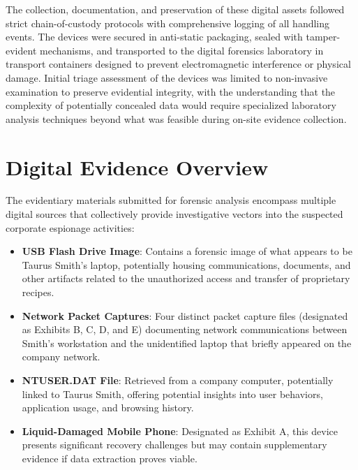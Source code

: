 The collection, documentation, and preservation of these digital assets followed strict chain-of-custody protocols with comprehensive logging of all handling events. The devices were secured in anti-static packaging, sealed with tamper-evident mechanisms, and transported to the digital forensics laboratory in transport containers designed to prevent electromagnetic interference or physical damage. Initial triage assessment of the devices was limited to non-invasive examination to preserve evidential integrity, with the understanding that the complexity of potentially concealed data would require specialized laboratory analysis techniques beyond what was feasible during on-site evidence collection.

\section{Digital Evidence Overview}
The evidentiary materials submitted for forensic analysis encompass multiple digital sources that collectively provide investigative vectors into the suspected corporate espionage activities:

\begin{itemize}
    \item \textbf{USB Flash Drive Image}: Contains a forensic image of what appears to be Taurus Smith's laptop, potentially housing communications, documents, and other artifacts related to the unauthorized access and transfer of proprietary recipes.
    
    \item \textbf{Network Packet Captures}: Four distinct packet capture files (designated as Exhibits B, C, D, and E) documenting network communications between Smith's workstation and the unidentified laptop that briefly appeared on the company network.
    
    \item \textbf{NTUSER.DAT File}: Retrieved from a company computer, potentially linked to Taurus Smith, offering potential insights into user behaviors, application usage, and browsing history.
    
    \item \textbf{Liquid-Damaged Mobile Phone}: Designated as Exhibit A, this device presents significant recovery challenges but may contain supplementary evidence if data extraction proves viable.
\end{itemize}

